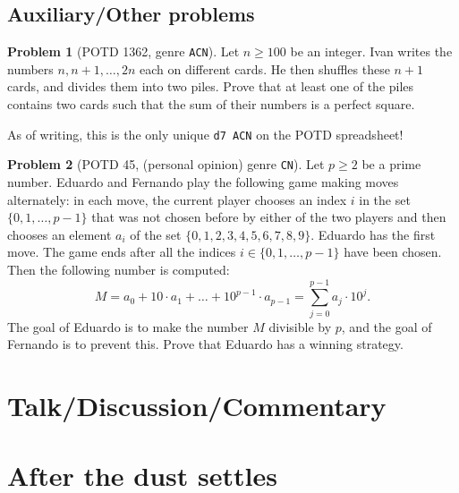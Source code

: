 \documentclass[11pt]{article} %
\theoremstyle{definition}
\newtheorem{problem}{Problem}
\theoremstyle{remark}
\begin{document}
\subsection{Auxiliary/Other problems}
\setcounter{problem}{0}

\begin{problem}[POTD 1362, genre \texttt{ACN}]
    Let \(n \geqslant 100\) be an integer. Ivan writes the numbers \(n, n+1, \ldots, 2 n\) each on different cards. He then shuffles these \(n+1\) cards, and divides them into two piles. Prove that at least one of the piles contains two cards such that the sum of their numbers is a perfect square.
    \begin{talks}
        \begin{talk}
            As of writing, this is the only unique \texttt{d7 ACN} on the POTD spreadsheet!
        \end{talk}
    \end{talks}
\end{problem}

\begin{problem}[POTD 45, (personal opinion) genre \texttt{CN}]
    Let \(p \geq 2\) be a prime number.
    Eduardo and Fernando play the following game making moves alternately: in each move, the current player chooses an index \(i\) in the set \(\{0,1,\dots,p-1 \}\) that was not chosen before by either of the two players and then chooses an element \(a_i\) of the set \(\{0,1,2,3,4,5,6,7,8,9\}\).
    Eduardo has the first move. The game ends after all the indices \(i \in \{0,1,\dots,p-1\}\) have been chosen. Then the following number is computed:
    \[M = a_0 + 10\cdot a_1 + \dots + 10^{p-1} \cdot a_{p-1} = \sum_{j=0}^{p-1} a_j \cdot 10^j.\]
    The goal of Eduardo is to make the number \(M\) divisible by \(p\), and the goal of Fernando is to prevent this. Prove that Eduardo has a winning strategy.
\end{problem}

\newpage

\section{Talk/Discussion/Commentary}

\printtalk

\newpage
\section*{After the dust settles}
\setcounter{problem}{0}
\end{document}
